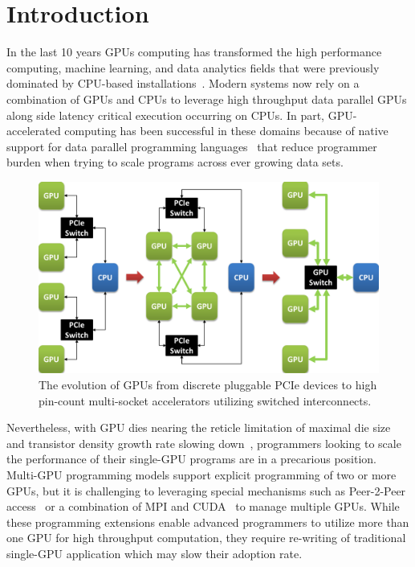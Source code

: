 \section{Introduction}
\label{introduction}

In the last 10 years GPUs computing has transformed the high performance 
computing, machine learning, and data analytics fields that were previously 
dominated by CPU-based 
installations~\cite{intersect360,cudnn,Lavin15b,SimonyanZ14a}. Modern systems 
now rely on a combination of GPUs and CPUs to leverage high throughput data 
parallel GPUs along side latency critical execution occurring on CPUs. In part, 
GPU-accelerated computing has been successful in these domains because of 
native 
support for data parallel programming languages~\cite{CUDA7,OPENCL} that reduce 
programmer burden when trying to scale programs across ever growing data sets.

\begin{figure}[t]
\centering
\includegraphics[width=1.0\columnwidth]{figures/inter_gpu_connections.pdf}
\caption{The evolution of GPUs from discrete pluggable PCIe devices to high 
pin-count 
multi-socket accelerators utilizing switched interconnects.}
\label{fig:systemdiagram}
\end{figure}

Nevertheless, with GPU dies nearing the reticle limitation of maximal die size 
and transistor density growth rate slowing down~\cite{mooredead2016}, 
programmers looking to scale the performance of their single-GPU programs are 
in 
a precarious position. Multi-GPU programming models support explicit 
programming 
of two or more GPUs, but it is challenging to leveraging special mechanisms 
such 
as Peer-2-Peer access~\cite{NVIDIAP2P} or a combination of MPI and 
CUDA~\cite{NVIDIAMPI} to manage multiple GPUs. While these programming 
extensions enable advanced programmers to utilize more than one GPU for high 
throughput computation, they require re-writing of traditional single-GPU 
application which may slow their adoption rate.

